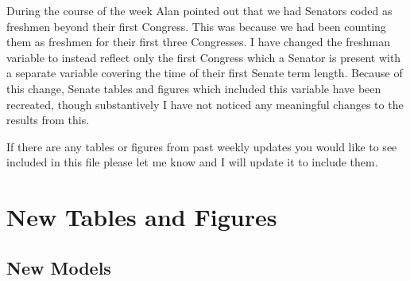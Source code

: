 \documentclass[12pt]{article}
\begin{document}
During the course of the week Alan pointed out that we had Senators coded as freshmen beyond their first Congress. This was because we had been counting them as freshmen for their first three Congresses. I have changed the freshman variable to instead reflect only the first Congress which a Senator is present with a separate variable covering the time of their first Senate term length. Because of this change, Senate tables and figures which included this variable have been recreated, though substantively I have not noticed any meaningful changes to the results from this.

If there are any tables or figures from past weekly updates you would like to see included in this file please let me know and I will update it to include them.

\clearpage

\section{New Tables and Figures}

\subsection{New Models}
\end{document}
